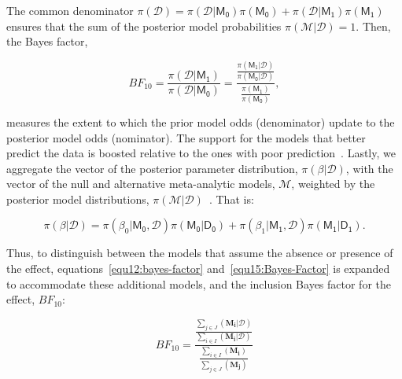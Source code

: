 \documentclass[12pt, english]{article}
\begin{document}
    The common denominator $\pi(\mathcal{D}) = \pi(\mathcal{D} | \mathsf{M_0})\pi(\mathsf{M_0}) + \pi(\mathcal{D} | \mathsf{M_1})\pi(\mathsf{M_1})$ ensures that the sum of the posterior model probabilities $\pi(\mathcal{M} | \mathcal{D}) = 1$. Then, the Bayes factor,

    \begin{equation}
        \label{equ15:Bayes-Factor}
        BF_{10} = \frac{\pi(\mathcal{D} | \mathsf{M_1})}{\pi(\mathcal{D} | \mathsf{M_0})} = \dfrac{\frac{\pi(\mathsf{M_1} | \mathcal{D})}{\pi(\mathsf{M_0} | \mathcal{D})}}{\frac{\pi(\mathsf{M_1})}{\pi(\mathsf{M_0})}},
    \end{equation}

    measures the extent to which the prior model odds (denominator) update to the posterior model odds (nominator). The support for the models that better predict the data is boosted relative to the ones with poor prediction~\parencites{roudermorey2019, wagenmakers2016}. Lastly, we aggregate the vector of the posterior parameter distribution, $\pi(\beta | \mathcal{D})$, with the vector of the null and alternative meta-analytic models, $\mathcal{M}$, weighted by the posterior model distributions, $\pi(\mathcal{M}|\mathcal{D})$~\parencites{jeffreys1935, wrinchjeffreys1921}. That is:

    \begin{equation}
        \label{equ16}
        \pi(\beta | \mathcal{D}) = \pi(\beta_0 | \mathsf{M_0}, \mathcal{D}) \pi(\mathsf{M_0} | \mathsf{D_0}) + \pi(\beta_1 | \mathsf{M_1}, \mathcal{D}) \pi(\mathsf{M_1} | \mathsf{D_1}).
    \end{equation}

    Thus, to distinguish between the models that assume the absence or presence of the effect, equations~\ref{equ12:bayes-factor} and~\ref{equ15:Bayes-Factor} is expanded to accommodate these additional models, and the inclusion Bayes factor for the effect, $BF_{10}:$

    \begin{equation}
        \label{equ17}
        BF_{10} = \dfrac{\frac{\sum_{j \in J}(\mathbf{M_i} | \mathcal{D})}{\sum_{i \in I}(\mathbf{M_i} | \mathcal{D})}}{\frac{\sum_{i \in I}(\mathbf{M_i})}{\sum_{j \in J}(\mathbf{M_j})}}
    \end{equation}
\end{document}
